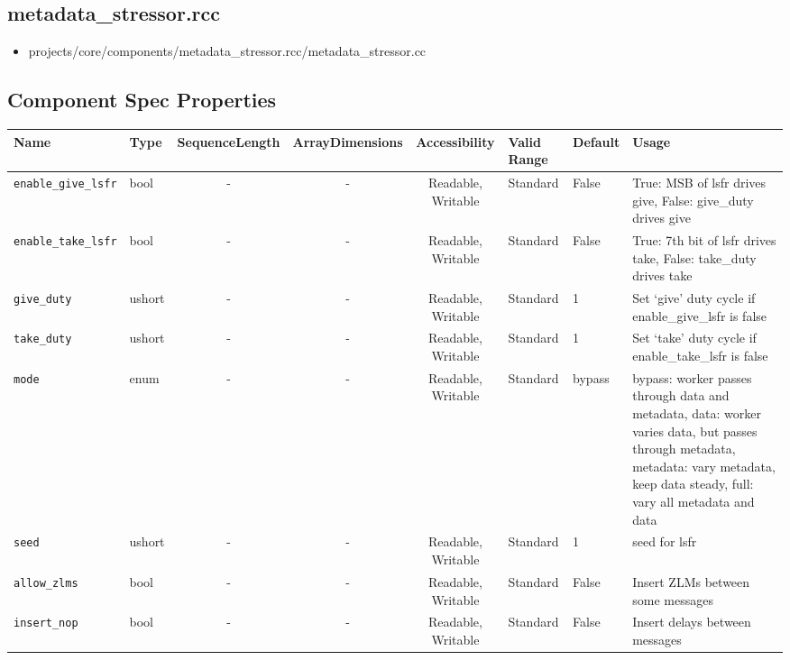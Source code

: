 \documentclass{article}
\def\comp{metadata\_stressor}
\begin{document}
\subsection*{\comp.rcc}
\begin{itemize}
	\item projects/core/components/metadata\_stressor.rcc/metadata\_stressor.cc
\end{itemize}

\begin{landscape}
	\section*{Component Spec Properties}
	\begin{scriptsize}
\begin{tabular}{|p{2cm}|p{1.5cm}|c|c|c|p{1.5cm}|p{1cm}|p{7cm}|}
\hline
\rowcolor{blue}
Name & Type & SequenceLength & ArrayDimensions & Accessibility & Valid Range & Default & Usage \\
\hline
\verb+enable_give_lsfr+  & bool & - & - & Readable, Writable & Standard & False & True: MSB of lsfr drives give, False: give\_duty drives give \\
\hline
\verb+enable_take_lsfr+  & bool & -  & - & Readable, Writable & Standard & False & True: 7th bit of lsfr drives take, False: take\_duty drives take \\
\hline
\verb+give_duty+     & ushort & -  & - & Readable, Writable & Standard & 1 & Set `give' duty cycle if enable\_give\_lsfr is false \\
\hline
\verb+take_duty+     & ushort & -  & -  & Readable, Writable & Standard & 1 & Set `take' duty cycle if enable\_take\_lsfr is false \\
\hline
\verb+mode+     & enum & -  & -  & Readable, Writable & Standard & bypass & bypass: worker passes through data and metadata, data: worker varies data, but passes through metadata, metadata: vary metadata, keep data steady, full: vary all metadata and data \\
\hline
\verb+seed+     & ushort & -  & - & Readable, Writable & Standard & 1 & seed for lsfr \\
\hline
\verb+allow_zlms+     & bool & -  & -  & Readable, Writable & Standard & False & Insert ZLMs between some messages \\
\hline
\verb+insert_nop+     & bool & -  & -  & Readable, Writable & Standard & False & Insert delays between messages \\
\hline
\end{tabular}
\end{scriptsize}


\end{landscape}
\end{document}
